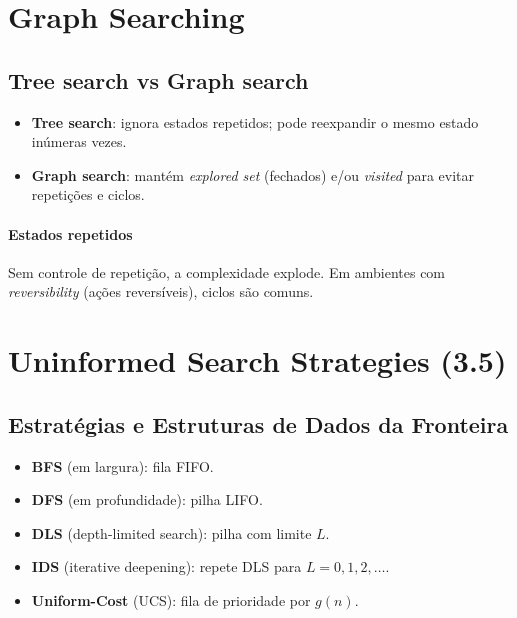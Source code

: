 \documentclass[9pt,a4paper]{extarticle}
\begin{document}
\section{Graph Searching}

\subsection*{Tree search vs Graph search}
\begin{itemize}
  \item \textbf{Tree search}: ignora estados repetidos; pode reexpandir o mesmo estado inúmeras vezes.
  \item \textbf{Graph search}: mantém \textit{explored set} (fechados) e/ou \textit{visited} para evitar repetições e ciclos.
\end{itemize}

\paragraph{Estados repetidos}
Sem controle de repetição, a complexidade explode.  
Em ambientes com \textit{reversibility} (ações reversíveis), ciclos são comuns.

\section{Uninformed Search Strategies (3.5)}

\subsection*{Estratégias e Estruturas de Dados da Fronteira}
\begin{itemize}
  \item \textbf{BFS} (em largura): fila FIFO.
  \item \textbf{DFS} (em profundidade): pilha LIFO.
  \item \textbf{DLS} (depth-limited search): pilha com limite $L$.
  \item \textbf{IDS} (iterative deepening): repete DLS para $L=0,1,2,\dots$.
  \item \textbf{Uniform-Cost} (UCS): fila de prioridade por $g(n)$.
\end{itemize}
\end{document}

